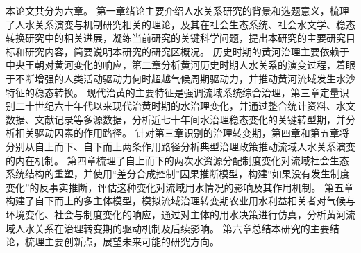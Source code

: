 本论文共分为六章。
第一章绪论主要介绍人\textendash{}水关系研究的背景和选题意义，梳理了人\textendash{}水关系演变与机制研究相关的理论，及其在社会\textendash{}生态系统、社会\textendash{}水文学、稳态转换研究中的相关进展，凝练当前研究的关键科学问题，提出本研究的主要研究目标和研究内容，简要说明本研究的研究区概况。
历史时期的黄河治理主要依赖于中央王朝对黄河变化的响应，第二章分析黄河历史时期人\textendash{}水关系的演变过程，着眼于不断增强的人类活动驱动力何时超越气候周期驱动力，并推动黄河流域发生水沙特征的稳态转换。
现代治黄的主要特征是强调流域系统综合治理，第三章定量识别二十世纪六十年代以来现代治黄时期的水治理变化，并通过整合统计资料、水文数据、文献记录等多源数据，分析近七十年间水治理稳态变化的关键转型期，并分析相关驱动因素的作用路径。
针对第三章识别的治理转变期，第四章和第五章将分别从自上而下、自下而上两条作用路径分析典型治理政策推动流域人\textendash{}水关系演变的内在机制。
第四章梳理了自上而下的两次水资源分配制度变化对流域社会\textendash{}生态系统结构的重塑，并使用“差分合成控制”因果推断模型，构建“如果没有发生制度变化”的反事实推断，评估这种变化对流域用水情况的影响及其作用机制。
第五章构建了自下而上的多主体模型，模拟流域治理转变期农业用水利益相关者对气候与环境变化、社会与制度变化的响应，通过对主体的用水决策进行仿真，分析黄河流域人\textendash{}水关系在治理转变期的驱动机制及后续影响。
第六章总结本研究的主要结论，梳理主要创新点，展望未来可能的研究方向。
